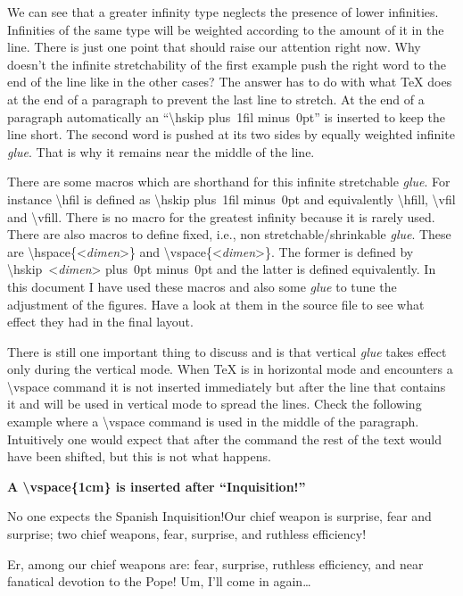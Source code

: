 \documentclass[a4paper]{article}
\newcommand{\bs}[1]{{\rmfamily\color{blue}\textbackslash{}#1}}
\newenvironment{example}[1]{%
\vspace{10pt}
\noindent\textbf{#1}\sffamily\par\vspace{10pt}%
}
{%
\par\vspace{10pt}
}
\begin{document}
We can see that a greater infinity type neglects the presence of lower infinities. Infinities of the same type will be weighted according to the amount of it in the line. There is just one point that should raise our attention right now. Why doesn't the infinite stretchability of the first example push the right word to the end of the line like in the other cases? The answer has to do with what \TeX{} does at the end of a paragraph to prevent the last line to stretch. At the end of a paragraph automatically an ``\bs{hskip} {\ttfamily 0pt plus~1fil minus~0pt}'' is inserted to keep the line short. The second word is pushed at its two sides by equally weighted infinite \emph{glue}. That is why it remains near the middle of the line.

There are some macros which are shorthand for this infinite stretchable \emph{glue}. For instance \bs{hfil} is defined as \bs{hskip} {\ttfamily 0pt plus~1fil minus~0pt} and equivalently \bs{hfill}, \bs{vfil} and \bs{vfill}. There is no macro for the greatest infinity because it is rarely used. There are also macros to define fixed, i.e., non stretchable/shrinkable \emph{glue}. These are \bs{hspace}\{<\textsf{\itshape dimen}>\} and \bs{vspace}\{<\textsf{\itshape dimen}>\}. The former is defined by \bs{hskip}{\ttfamily~<\textsf{\itshape dimen}> plus~0pt minus~0pt} and the latter is defined equivalently. In this document I have used these macros and also some \emph{glue} to tune the adjustment of the figures. Have a look at them in the source file to see what effect they had in the final layout. 

There is still one important  thing to discuss and is that vertical \emph{glue} takes effect only during the vertical mode. When \TeX{} is in horizontal mode and encounters a \bs{vspace} command it is not inserted immediately but after the line that contains it and will be used in vertical mode to spread the lines. Check the following example where a \bs{vspace} command is used in the middle of the paragraph. Intuitively one would expect that after the command the rest of the text would have been shifted, but this is not what happens.

\newpage\begin{example}{A \bs{vspace}\{1cm\} is inserted after ``Inquisition!''}
No one expects the Spanish Inquisition!\vspace{1cm}Our chief weapon is surprise, fear and surprise; two chief weapons, fear, surprise, and ruthless efficiency! 

Er, among our chief weapons are: fear, surprise, ruthless efficiency, and near fanatical devotion to the Pope! Um, I'll come in again\dots
\end{example}
\end{document}
